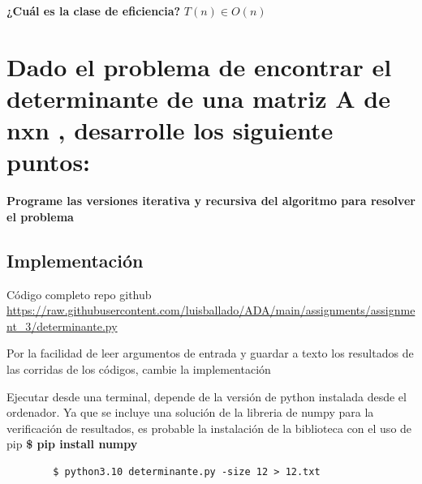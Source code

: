 \documentclass{article}
\begin{document}
\begin{question}
  \textbf{¿Cuál es la clase de eficiencia?}
  \textit{$T(n) \in O(n)$}
    
\end{question}

\newpage
\section{Dado el problema de encontrar el determinante de una matriz A de nxn , desarrolle los siguiente puntos:}

\begin{question}
  \textbf{Programe las versiones iterativa y recursiva del algoritmo para resolver el problema}
\end{question}

\subsection{Implementación}

Código completo repo github \url{https://raw.githubusercontent.com/luisballado/ADA/main/assignments/assignment_3/determinante.py}

Por la facilidad de leer argumentos de entrada y guardar a texto los resultados de las corridas de los códigos, cambie la implementación

Ejecutar desde una terminal, depende de la versión de python instalada desde el ordenador. Ya que se incluye una solución de la libreria de numpy para la verificación de resultados, es probable la instalación de la biblioteca con el uso de pip \textbf{\$ pip install numpy}

\begin{commandline}
	\begin{verbatim}
		$ python3.10 determinante.py -size 12 > 12.txt
	\end{verbatim}
\end{commandline}
\end{document}
